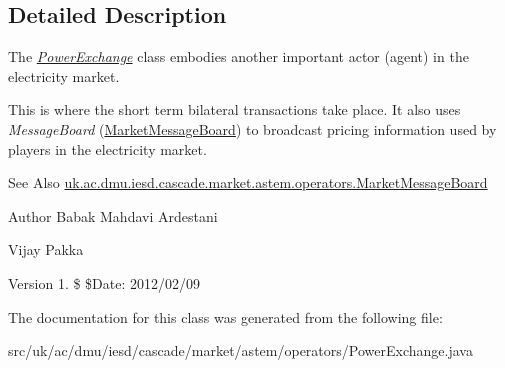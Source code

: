 \subsection{Detailed Description}
The {\itshape \hyperlink{classuk_1_1ac_1_1dmu_1_1iesd_1_1cascade_1_1market_1_1astem_1_1operators_1_1_power_exchange}{Power\-Exchange}} class embodies another important actor (agent) in the electricity market. 

This is where the short term bilateral transactions take place. It also uses {\itshape Message\-Board} (\hyperlink{classuk_1_1ac_1_1dmu_1_1iesd_1_1cascade_1_1market_1_1astem_1_1operators_1_1_market_message_board}{Market\-Message\-Board}) to broadcast pricing information used by players in the electricity market.

\begin{DoxySeeAlso}{See Also}
\hyperlink{classuk_1_1ac_1_1dmu_1_1iesd_1_1cascade_1_1market_1_1astem_1_1operators_1_1_market_message_board}{uk.\-ac.\-dmu.\-iesd.\-cascade.\-market.\-astem.\-operators.\-Market\-Message\-Board}
\end{DoxySeeAlso}
\begin{DoxyAuthor}{Author}
Babak Mahdavi Ardestani 

Vijay Pakka 
\end{DoxyAuthor}
\begin{DoxyVersion}{Version}
1. \$ \$\-Date\-: 2012/02/09 
\end{DoxyVersion}


The documentation for this class was generated from the following file\-:\begin{DoxyCompactItemize}
\item 
src/uk/ac/dmu/iesd/cascade/market/astem/operators/Power\-Exchange.\-java\end{DoxyCompactItemize}
